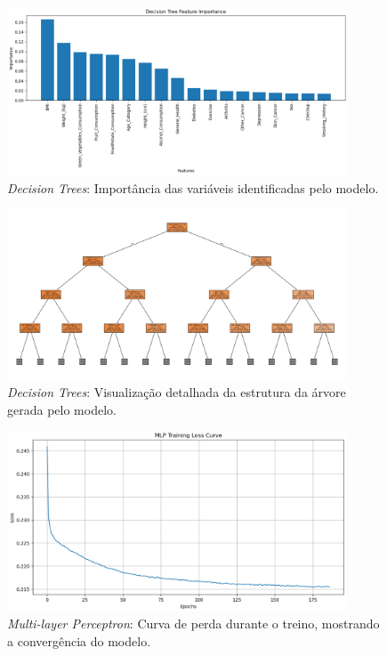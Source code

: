 \begin{figure}[H]
    \centering
    \includegraphics[width=0.9\textwidth]{images/feature_importance.png}
    \caption{\textit{Decision Trees}: Importância das variáveis identificadas pelo modelo.}
    \label{fig:feature_importance}
\end{figure}

\begin{figure}[H]
    \centering
    \includegraphics[width=0.9\textwidth]{images/decision_tree_structure.png}
    \caption{\textit{Decision Trees}: Visualização detalhada da estrutura da árvore gerada pelo modelo.}
    \label{fig:decision_tree_structure}
\end{figure}

\begin{figure}[H]
    \centering
    \includegraphics[width=0.9\textwidth]{images/mlp_training_loss.png}
    \caption{\textit{Multi-layer Perceptron}: Curva de perda durante o treino, mostrando a convergência do modelo.}
    \label{fig:mlp_training_loss}
\end{figure}

